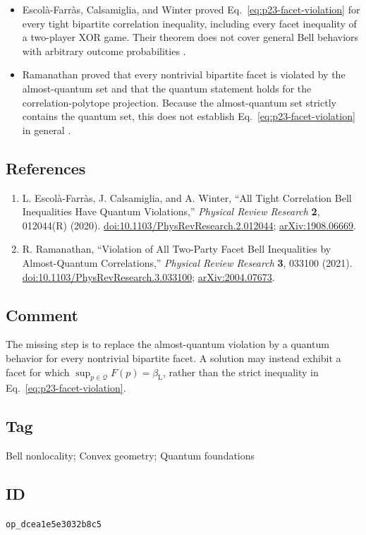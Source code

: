 \begin{itemize}
  \item Escolà-Farràs, Calsamiglia, and Winter proved
  Eq.~\eqref{eq:p23-facet-violation} for every tight bipartite correlation
  inequality, including every facet inequality of a two-player XOR game.
  Their theorem does not cover general Bell behaviors with arbitrary outcome
  probabilities .

  \item Ramanathan proved that every nontrivial bipartite facet is violated by
  the almost-quantum set and that the quantum statement holds for the
  correlation-polytope projection.  Because the almost-quantum set strictly
  contains the quantum set, this does not establish
  Eq.~\eqref{eq:p23-facet-violation} in general
  .
\end{itemize}

\subsection*{References}

\begin{enumerate}[label={},leftmargin=4.8em,labelsep=0.5em]
  \footnotesize
  \item[\textup{[ECW20]}]\label{ref:p23-correlation-facets}
  L. Escolà-Farràs, J. Calsamiglia, and A. Winter,
  ``All Tight Correlation Bell Inequalities Have Quantum Violations,''
  \emph{Physical Review Research} \textbf{2}, 012044(R) (2020).
  \href{https://doi.org/10.1103/PhysRevResearch.2.012044}{doi:10.1103/PhysRevResearch.2.012044};
  \href{https://arxiv.org/abs/1908.06669}{arXiv:1908.06669}.

  \item[\textup{[Ram21]}]\label{ref:p23-almost-quantum}
  R. Ramanathan,
  ``Violation of All Two-Party Facet Bell Inequalities by Almost-Quantum
  Correlations,'' \emph{Physical Review Research} \textbf{3}, 033100 (2021).
  \href{https://doi.org/10.1103/PhysRevResearch.3.033100}{doi:10.1103/PhysRevResearch.3.033100};
  \href{https://arxiv.org/abs/2004.07673}{arXiv:2004.07673}.
\end{enumerate}

\subsection*{Comment}

The missing step is to replace the almost-quantum violation by a quantum
behavior for every nontrivial bipartite facet.  A solution may instead exhibit
a facet for which
$\sup_{p\in\mathcal Q}F(p)=\beta_{\mathrm L}$, rather than the strict
inequality in Eq.~\eqref{eq:p23-facet-violation}.

\subsection*{Tag}

Bell nonlocality; Convex geometry; Quantum foundations

\subsection*{ID}

\texttt{op\_dcea1e5e3032b8c5}
